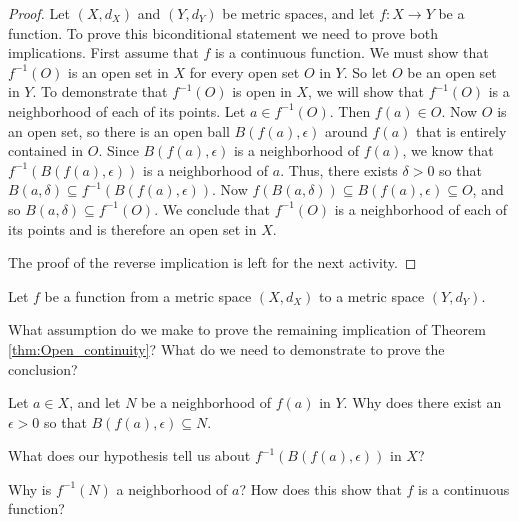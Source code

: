 \begin{proof} Let $(X, d_X)$ and $(Y,d_Y)$ be metric spaces, and let $f : X \to Y$ be a function. To prove this biconditional statement we need to prove both implications. First assume that $f$ is a continuous function. We must show that $f^{-1}(O)$ is an open set in $X$ for every open set $O$ in $Y$. So let $O$ be an open set in $Y$. To demonstrate that $f^{-1}(O)$ is open in $X$, we will show that $f^{-1}(O)$ is a neighborhood of each of its points. Let $a \in f^{-1}(O)$. Then $f(a) \in O$. Now $O$ is an open set, so there is an open ball $B(f(a), \epsilon)$ around $f(a)$ that is entirely contained in $O$. Since $B(f(a), \epsilon)$ is a neighborhood of $f(a)$, we know that $f^{-1}(B(f(a), \epsilon))$ is a neighborhood of $a$. Thus, there exists $\delta > 0$ so that $B(a, \delta) \subseteq f^{-1}(B(f(a), \epsilon))$. Now $f(B(a, \delta)) \subseteq B(f(a), \epsilon) \subseteq O$, and so $B(a, \delta) \subseteq f^{-1}(O)$. We conclude that $f^{-1}(O)$ is a neighborhood of each of its points and is therefore an open set in $X$.

The proof of the reverse implication is left for the next activity.
\end{proof}


\begin{activity} Let $f$ be a function from a metric space $(X,d_X)$ to a metric space $(Y,d_Y)$. 
\ba
\item What assumption do we make to prove the remaining implication of Theorem \ref{thm:Open_continuity}? What do we need to demonstrate to prove the conclusion?

\item Let $a \in X$, and let $N$ be a neighborhood of $f(a)$ in $Y$. Why does there exist an $\epsilon > 0$ so that $B(f(a), \epsilon) \subseteq N$.

\item What does our hypothesis tell us about $f^{-1}(B(f(a), \epsilon))$ in $X$?

\item Why is $f^{-1}(N)$ a neighborhood of $a$? How does this show that $f$ is a continuous function? 

\ea

\end{activity}

